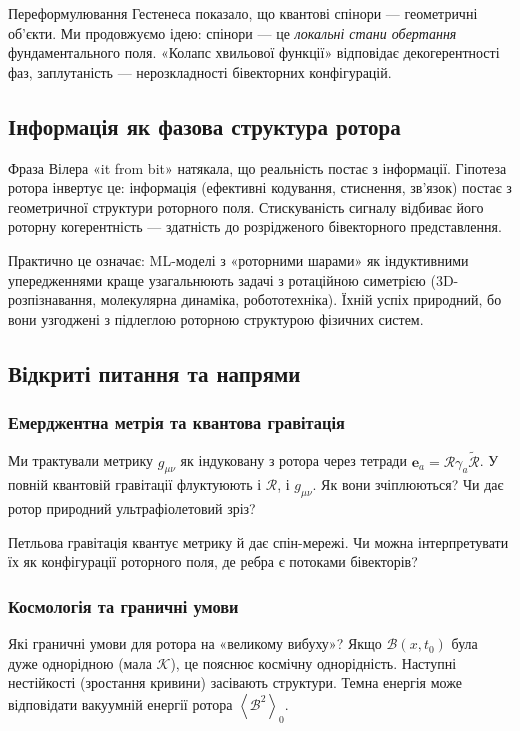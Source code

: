 \documentclass[11pt,a4paper]{article}
\newcommand{\grade}[2]{\left\langle #1 \right\rangle_{#2}}
\newcommand{\scal}[1]{\grade{#1}{0}}
\newcommand{\rev}[1]{\widetilde{#1}}           %
\newcommand{\Rotor}{\mathcal{R}}
\newcommand{\Biv}{\mathcal{B}}
\theoremstyle{definition}
\theoremstyle{plain}
\theoremstyle{remark}
\begin{document}
Переформулювання Гестенеса показало, що квантові спінори — геометричні об’єкти. Ми продовжуємо ідею: спінори — це \emph{локальні стани обертання} фундаментального поля. «Колапс хвильової функції» відповідає декогерентності фаз, заплутаність — нерозкладності бівекторних конфігурацій.

\subsection{Інформація як фазова структура ротора}

Фраза Вілера «it from bit» натякала, що реальність постає з інформації. Гіпотеза ротора інвертує це: інформація (ефективні кодування, стиснення, зв’язок) постає з геометричної структури роторного поля. Стискуваність сигналу відбиває його роторну когерентність — здатність до розрідженого бівекторного представлення.

Практично це означає: ML-моделі з «роторними шарами» як індуктивними упередженнями краще узагальнюють задачі з ротаційною симетрією (3D-розпізнавання, молекулярна динаміка, робототехніка). Їхній успіх природний, бо вони узгоджені з підлеглою роторною структурою фізичних систем.

\subsection{Відкриті питання та напрями}

\subsubsection{Емерджентна метрія та квантова гравітація}

Ми трактували метрику $g_{\mu\nu}$ як індуковану з ротора через тетради $\mathbf{e}_a = \Rotor \gamma_a \rev{\Rotor}$. У повній квантовій гравітації флуктуюють і $\Rotor$, і $g_{\mu\nu}$. Як вони зчіплюються? Чи дає ротор природний ультрафіолетовий зріз?

Петльова гравітація квантує метрику й дає спін-мережі. Чи можна інтерпретувати їх як конфігурації роторного поля, де ребра є потоками бівекторів?

\subsubsection{Космологія та граничні умови}

Які граничні умови для ротора на «великому вибуху»? Якщо $\Biv(x,t_0)$ була дуже однорідною (мала $\mathcal{K}$), це пояснює космічну однорідність. Наступні нестійкості (зростання кривини) засівають структури. Темна енергія може відповідати вакуумній енергії ротора $\scal{\Biv^2}$.
\end{document}
